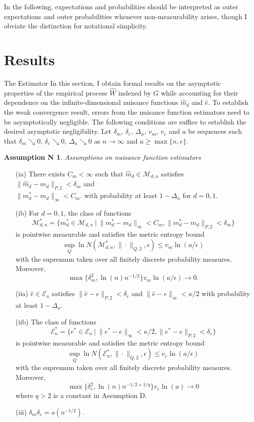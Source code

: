 \documentclass[12pt,oneside,reqno,english]{amsart}
\makeatletter
\renewcommand\subsection{\@startsection{subsection}{2}%
  \z@{-.5\linespacing\@plus-.7\linespacing}{.5\linespacing}%
  {\normalfont\scshape}}
\theoremstyle{definition}
\newtheorem*{asmN}{Assumption N}
\makeatother
\begin{document}
In the following, expectations and probabilities should be interpreted as
outer expectations and outer probabilities whenever non-measurability arises, though I obviate the distinction for notational simplicity.

\section{Results}\label{main}
\subsection{The Estimator}\label{est}
In this section, I obtain formal results on the asymptotic properties of the empirical process $\hat{W}$ indexed by $G$ while accounting for their dependence on the 
infinite-dimensional nuisance functions $\hat{m}_{d}$ and $\hat{e}$. 
To establish the weak convergence result, errors from the nuisance function estimators need to be asymptotically negligible. 
The following conditions are suffice to establish the desired asymptotic negligibility. 
Let $\delta_{m}$, $\delta_{e}$, $\Delta_{n}$, $v_{m}$, $v_{e}$ and $a$ be sequences such that 
$\delta_{m}\searrow 0$, $\delta_{e}\searrow 0$, $\Delta_{n}\searrow 0$ as $n\rightarrow \infty$ and $a\geq \max\{n,e\}$. 
\begin{asmN} \textit{Assumptions on nuisance function estimators}
\begin{itemize}
\item[{(ia)}] There exists $C_{m}<\infty$ such that $\hat{m}_{d}\in \mathcal{M}_{d,n}$ satisfies 
$\|\hat{m}_{d}-m_{d}\|_{P,2}<\delta_{m}$ and\\ $\|m^{*}_{d}-m_{d}\|_{\infty}<C_{m}$.
 with probability at least $1-\Delta_{n}$ for $d=0,1$. 
\item[{(ib)}] For $d=0,1$, the class of functions
\[\mathcal{M}^{*}_{d,n}=\{m^{*}_{d}\in \mathcal{M}_{d,n}\ | \ \|m^{*}_{d}-m_{d}\|_{\infty}<C_{m}, \|m^{*}_{d}-m_{d}\|_{P,2}<\delta_{m}\}\] 
is pointwise measurable and satisfies the metric entropy bound
\[\sup_{Q}\ln N(\mathcal{M}^{*}_{d,n},\|\cdot\|_{Q,2},\epsilon)\leq v_{m}\ln(a/\epsilon)\]
with the supremum taken over all finitely discrete probability measures.
 Moreover, 
\[\max\{\delta_{m}^{2},\ln(n)n^{-1/2}\}v_{m}\ln(a/\epsilon)\rightarrow 0.\]
\item[{(iia)}] $\hat{e}\in \mathcal{E}_{n}$ satisfies 
$\|\hat{e}-e\|_{P,2}<\delta_{e}$ 
and
$\|\hat{e}-e\|_{\infty}<\kappa/2$ 
 with probability at least $1-\Delta_{n}$. 
\item[{(iib)}] The class of functions 
\[\mathcal{E}^{*}_{n}=\{e^{*}\in \mathcal{E}_{n}\ | \ \|e^{*}-e\|_{\infty}<\kappa/2, \|e^{*}-e\|_{P,2}<\delta_{e}\}\] 
is pointwise measurable and satisfies the metric entropy bound
\[\sup_{Q}\ln N(\mathcal{E}^{*}_{n},\|\cdot\|_{Q,2},\epsilon)\leq v_{e}\ln(a/\epsilon)\]
with the supremum taken over all finitely discrete probability measures. 
Moreover, 
\[\max\{\delta_{e}^{2},\ln(n)n^{-1/2+1/q}\}v_{e}\ln(a)\rightarrow 0\]
where $q>2$ is a constant in Assumption D. 
\item[(iii)] $\delta_{m}\delta_{e}=o(n^{-1/2})$.
\end{itemize}
\end{asmN}
\end{document}
